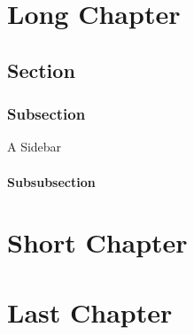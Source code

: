 \documentclass[letterpaper,twoside,twocolumn,openany,nodeprecatedcode]{dndbook}
\begin{document}
\chapter{Long Chapter}
\lipsum[1-4]
\section{Section}
\lipsum[5-8]
\subsection{Subsection}
\lipsum[9-11]
\begin{DndSidebar}{A Sidebar}
  \lipsum[12]
\end{DndSidebar}
\subsubsection{Subsubsection}
\lipsum[13-17]

\chapter{Short Chapter}
\lipsum[18-20]

\chapter{Last Chapter}
\lipsum[21-26]
\end{document}
